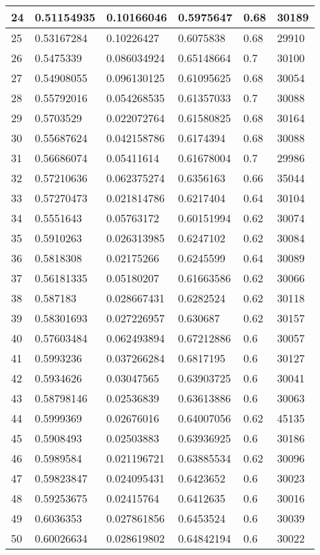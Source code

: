 \begin{longtable}{|l|l|l|l|l|l|}
24 & 0.51154935 & 0.10166046 & 0.5975647 & 0.68 & 30189 \\ \hline 
25 & 0.53167284 & 0.10226427 & 0.6075838 & 0.68 & 29910 \\ \hline 
26 & 0.5475339 & 0.086034924 & 0.65148664 & 0.7 & 30100 \\ \hline 
27 & 0.54908055 & 0.096130125 & 0.61095625 & 0.68 & 30054 \\ \hline 
28 & 0.55792016 & 0.054268535 & 0.61357033 & 0.7 & 30088 \\ \hline 
29 & 0.5703529 & 0.022072764 & 0.61580825 & 0.68 & 30164 \\ \hline 
30 & 0.55687624 & 0.042158786 & 0.6174394 & 0.68 & 30088 \\ \hline 
31 & 0.56686074 & 0.05411614 & 0.61678004 & 0.7 & 29986 \\ \hline 
32 & 0.57210636 & 0.062375274 & 0.6356163 & 0.66 & 35044 \\ \hline 
33 & 0.57270473 & 0.021814786 & 0.6217404 & 0.64 & 30104 \\ \hline 
34 & 0.5551643 & 0.05763172 & 0.60151994 & 0.62 & 30074 \\ \hline 
35 & 0.5910263 & 0.026313985 & 0.6247102 & 0.62 & 30084 \\ \hline 
36 & 0.5818308 & 0.02175266 & 0.6245599 & 0.64 & 30089 \\ \hline 
37 & 0.56181335 & 0.05180207 & 0.61663586 & 0.62 & 30066 \\ \hline 
38 & 0.587183 & 0.028667431 & 0.6282524 & 0.62 & 30118 \\ \hline 
39 & 0.58301693 & 0.027226957 & 0.630687 & 0.62 & 30157 \\ \hline 
40 & 0.57603484 & 0.062493894 & 0.67212886 & 0.6 & 30057 \\ \hline 
41 & 0.5993236 & 0.037266284 & 0.6817195 & 0.6 & 30127 \\ \hline 
42 & 0.5934626 & 0.03047565 & 0.63903725 & 0.6 & 30041 \\ \hline 
43 & 0.58798146 & 0.02536839 & 0.63613886 & 0.6 & 30063 \\ \hline 
44 & 0.5999369 & 0.02676016 & 0.64007056 & 0.62 & 45135 \\ \hline 
45 & 0.5908493 & 0.02503883 & 0.63936925 & 0.6 & 30186 \\ \hline 
46 & 0.5989584 & 0.021196721 & 0.63885534 & 0.62 & 30096 \\ \hline 
47 & 0.59823847 & 0.024095431 & 0.6423652 & 0.6 & 30023 \\ \hline 
48 & 0.59253675 & 0.02415764 & 0.6412635 & 0.6 & 30016 \\ \hline 
49 & 0.6036353 & 0.027861856 & 0.6453524 & 0.6 & 30039 \\ \hline 
50 & 0.60026634 & 0.028619802 & 0.64842194 & 0.6 & 30022 \\ \hline 
\end{longtable}